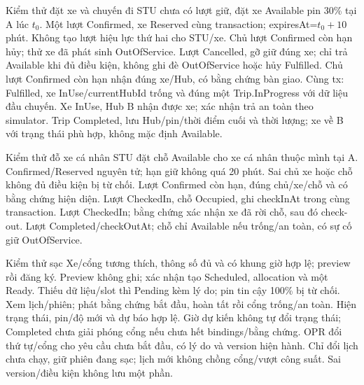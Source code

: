 \begin{SystemTestCases}{Kiểm thử đặt xe và chuyến đi}
{STU chưa có lượt giữ, đặt xe Available pin 30\% tại A lúc $t_0$.}
{Một lượt Confirmed, xe Reserved cùng transaction; expiresAt=$t_0+10$ phút. Không tạo lượt hiệu lực thứ hai cho STU/xe.}
{Chủ lượt Confirmed còn hạn hủy; thử xe đã phát sinh OutOfService.}
{Lượt Cancelled, gỡ giữ đúng xe; chỉ trả Available khi đủ điều kiện, không ghi đè OutOfService hoặc hủy Fulfilled.}
{Chủ lượt Confirmed còn hạn nhận đúng xe/Hub, có bằng chứng bàn giao.}
{Cùng tx: Fulfilled, xe InUse/currentHubId trống và đúng một Trip.InProgress với dữ liệu đầu chuyến.}
{Xe InUse, Hub B nhận được xe; xác nhận trả an toàn theo simulator.}
{Trip Completed, lưu Hub/pin/thời điểm cuối và thời lượng; xe về B với trạng thái phù hợp, không mặc định Available.}
\end{SystemTestCases}

\begin{SystemTestCases}{Kiểm thử đỗ xe cá nhân}
{STU đặt chỗ Available cho xe cá nhân thuộc mình tại A.}
{Confirmed/Reserved nguyên tử; hạn giữ không quá 20 phút. Sai chủ xe hoặc chỗ không đủ điều kiện bị từ chối.}
{Lượt Confirmed còn hạn, đúng chủ/xe/chỗ và có bằng chứng hiện diện.}
{Lượt CheckedIn, chỗ Occupied, ghi checkInAt trong cùng transaction.}
{Lượt CheckedIn; bằng chứng xác nhận xe đã rời chỗ, sau đó check-out.}
{Lượt Completed/checkOutAt; chỗ chỉ Available nếu trống/an toàn, có sự cố giữ OutOfService.}
\end{SystemTestCases}

\begin{SystemTestCases}{Kiểm thử sạc}
{Xe/cổng tương thích, thông số đủ và có khung giờ hợp lệ; preview rồi đăng ký.}
{Preview không ghi; xác nhận tạo Scheduled, allocation và một Ready. Thiếu dữ liệu/slot thì Pending kèm lý do; pin tin cậy 100\% bị từ chối.}
{Xem lịch/phiên; phát bằng chứng bắt đầu, hoàn tất rồi cổng trống/an toàn.}
{Hiện trạng thái, pin/độ mới và dự báo hợp lệ. Giờ dự kiến không tự đổi trạng thái; Completed chưa giải phóng cổng nếu chưa hết bindings/bằng chứng.}
{OPR đổi thứ tự/cổng cho yêu cầu chưa bắt đầu, có lý do và version hiện hành.}
{Chỉ đổi lịch chưa chạy, giữ phiên đang sạc; lịch mới không chồng cổng/vượt công suất. Sai version/điều kiện không lưu một phần.}
\end{SystemTestCases}

